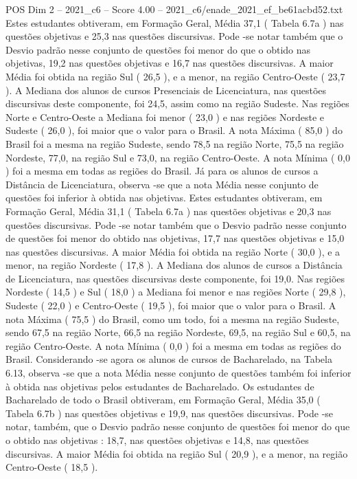 \begin{textsample}{POS Dim 2 – 2021\_c6 – Score 4.00 – 2021\_c6/enade\_2021\_ef\_be61acbd52.txt}
Estes estudantes obtiveram, em Formação Geral, Média 37,1 ( Tabela 6.7a ) nas questões objetivas e 25,3 nas questões discursivas.
Pode -se notar também que o Desvio padrão nesse conjunto de questões foi menor do que o obtido nas objetivas, 19,2 nas questões objetivas e 16,7 nas questões discursivas.
A maior Média foi obtida na região Sul ( 26,5 ), e a menor, na região Centro-Oeste ( 23,7 ).
A Mediana dos alunos de cursos Presenciais de Licenciatura, nas questões discursivas deste componente, foi 24,5, assim como na região Sudeste.
Nas regiões Norte e Centro-Oeste a Mediana foi menor ( 23,0 ) e nas regiões Nordeste e Sudeste ( 26,0 ), foi maior que o valor para o Brasil.
A nota Máxima ( 85,0 ) do Brasil foi a mesma na região Sudeste, sendo 78,5 na região Norte, 75,5 na região Nordeste, 77,0, na região Sul e 73,0, na região Centro-Oeste.
A nota Mínima ( 0,0 ) foi a mesma em todas as regiões do Brasil.
Já para os alunos de cursos a Distância de Licenciatura, observa -se que a nota Média nesse conjunto de questões foi inferior à obtida nas objetivas.
Estes estudantes obtiveram, em Formação Geral, Média 31,1 ( Tabela 6.7a ) nas questões objetivas e 20,3 nas questões discursivas.
Pode -se notar também que o Desvio padrão nesse conjunto de questões foi menor do obtido nas objetivas, 17,7 nas questões objetivas e 15,0 nas questões discursivas.
A maior Média foi obtida na região Norte ( 30,0 ), e a menor, na região Nordeste ( 17,8 ).
A Mediana dos alunos de cursos a Distância de Licenciatura, nas questões discursivas deste componente, foi 19,0.
Nas regiões Nordeste ( 14,5 ) e Sul ( 18,0 ) a Mediana foi menor e nas regiões Norte ( 29,8 ), Sudeste ( 22,0 ) e Centro-Oeste ( 19,5 ), foi maior que o valor para o Brasil.
A nota Máxima ( 75,5 ) do Brasil, como um todo, foi a mesma na região Sudeste, sendo 67,5 na região Norte, 66,5 na região Nordeste, 69,5, na região Sul e 60,5, na região Centro-Oeste.
A nota Mínima ( 0,0 ) foi a mesma em todas as regiões do Brasil.
Considerando -se agora os alunos de cursos de Bacharelado, na Tabela 6.13, observa -se que a nota Média nesse conjunto de questões também foi inferior à obtida nas objetivas pelos estudantes de Bacharelado.
Os estudantes de Bacharelado de todo o Brasil obtiveram, em Formação Geral, Média 35,0 ( Tabela 6.7b ) nas questões objetivas e 19,9, nas questões discursivas.
Pode -se notar, também, que o Desvio padrão nesse conjunto de questões foi menor do que o obtido nas objetivas : 18,7, nas questões objetivas e 14,8, nas questões discursivas.
A maior Média foi obtida na região Sul ( 20,9 ), e a menor, na região Centro-Oeste ( 18,5 ).

\end{textsample}
